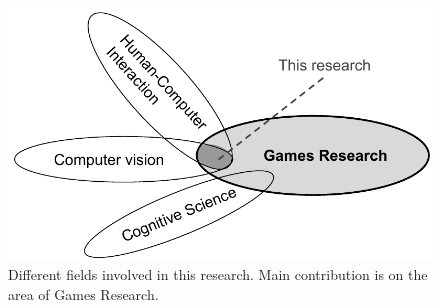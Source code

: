 \begin{figure}[h]
    \centering
    \includegraphics[scale=0.6]{Content/figures/fields}
    \caption{Different fields involved in this research. Main contribution is on the area of Games Research.}
    \label{fig:fields}
\end{figure}

